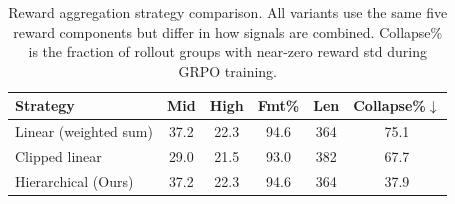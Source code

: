\begin{table}[H]
\centering
\small
\caption{Reward aggregation strategy comparison. All variants use the same
five reward components but differ in how signals are combined. Collapse\% is
the fraction of rollout groups with near-zero reward std during GRPO training.}
\label{tab:aggregation_ablation}
\setlength{\tabcolsep}{4pt}
\begin{tabular}{@{}l ccccc@{}}
\toprule
\textbf{Strategy}
  & \textbf{Mid} & \textbf{High} & \textbf{Fmt\%}
  & \textbf{Len} & \textbf{Collapse\%}$\downarrow$ \\
\midrule
Linear (weighted sum)   & 37.2 & 22.3 & 94.6 & 364 & 75.1 \\
Clipped linear          & 29.0 & 21.5 & 93.0 & 382 & 67.7 \\
\rowcolor{blue!6}
Hierarchical (Ours)     & 37.2 & 22.3 & 94.6 & 364 & 37.9 \\
\bottomrule
\end{tabular}
\end{table}
